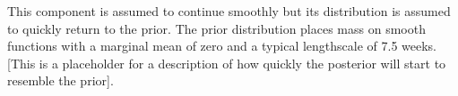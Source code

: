 This component is assumed to continue smoothly but its distribution is assumed to quickly return to the prior.
The prior distribution places mass on smooth functions with a marginal mean of zero and a typical lengthscale of 7.5 weeks.
[This is a placeholder for a description of how quickly the posterior will start to resemble the prior].